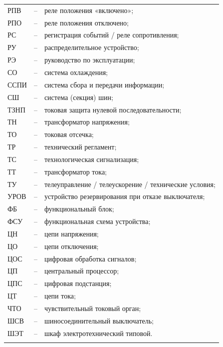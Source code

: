 \begin{longtable}{>{\raggedright\arraybackslash}m{2cm}>{\raggedright\arraybackslash}m{0.5cm}>{\raggedright\arraybackslash}m{20cm}}
РПВ & -- & реле положения «включено»; \\
РПО & -- & реле положения отключено; \\
РС & -- & регистрация событий / реле сопротивления; \\
РУ & -- & распределительное устройство; \\
РЭ & -- & руководство по эксплуатации; \\
СО & -- & система охлаждения; \\
ССПИ & -- & система сбора и передачи информации; \\
СШ & -- & система (секция) шин; \\
ТЗНП & -- & токовая защита нулевой последовательности; \\
ТН & -- & трансформатор напряжения; \\
ТО & -- & токовая отсечка; \\
ТР & -- & технический регламент; \\
ТС & -- & технологическая сигнализация; \\
ТТ & -- & трансформатор тока; \\
ТУ & -- & телеуправление / телеускорение / технические условия; \\
УРОВ & -- & устройство резервирования при отказе выключателя; \\
ФБ & -- & функциональный блок; \\
ФСУ & -- & функциональная схема устройства; \\
ЦН & -- & цепи напряжения; \\
ЦО & -- & цепи отключения; \\
ЦОС & -- & цифровая обработка сигналов; \\
ЦП & -- & центральный процессор; \\
ЦПС & -- & цифровая подстанция; \\
ЦТ & -- & цепи тока; \\
ЧТО & -- & чувствительный токовый орган; \\
ШСВ & -- & шиносоединительный выключатель; \\
ШЭТ & -- & шкаф электротехнический типовой. \\
{\color{white}\fontsize{0.1pt}{0.1pt}\selectfont<endABBRS>}
\end{longtable}
